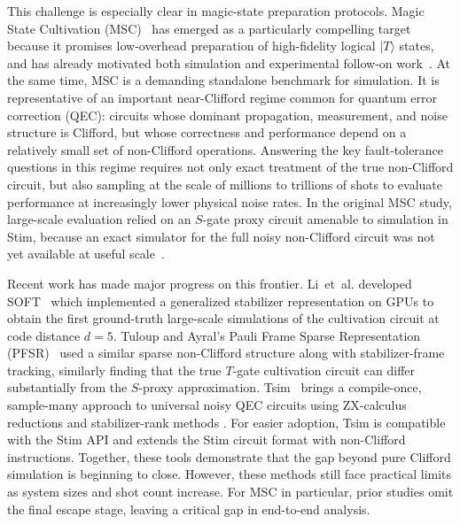 \documentclass[a4paper, onecolumn, unpublished]{quantumarticle}
\begin{document}
    This challenge is especially clear in magic-state preparation protocols. Magic State Cultivation (MSC)~\cite{gidneyMagicStateCultivation2024} has emerged as a particularly compelling target because it promises low-overhead preparation of high-fidelity logical $|T\rangle$ states, and has already motivated both simulation and experimental follow-on work~\cite{rosenfeldMagicStateCultivation2025, chenEfficientMagicState2026, dasuBreakingEvenMagic2025a, sahayFoldtransversalSurfaceCode2026a, hiranoEfficientMagicState2025, vakninEfficientMagicState2026}. At the same time, MSC is a demanding standalone benchmark for simulation. It is representative of an important near-Clifford regime common for quantum error correction (QEC): circuits whose dominant propagation, measurement, and noise structure is Clifford, but whose correctness and performance depend on a relatively small set of non-Clifford operations. Answering the key fault-tolerance questions in this regime requires not only exact treatment of the true non-Clifford circuit, but also sampling at the scale of millions to trillions of shots to evaluate performance at increasingly lower physical noise rates. In the original MSC study, large-scale evaluation  relied on an $S$-gate proxy circuit amenable to simulation in Stim, because an exact simulator for the full noisy non-Clifford circuit was not yet available at useful scale~\cite{gidneyMagicStateCultivation2024}.

    Recent work has made major progress on this frontier. Li~et~al. developed SOFT~\cite{liSOFTHighperformanceSimulator2025} which implemented a generalized stabilizer representation on GPUs to obtain the first ground-truth large-scale simulations of the cultivation circuit at code distance $d=5$. Tuloup and Ayral's Pauli Frame Sparse Representation (PFSR)~\cite{tuloupComputingLogicalError2026a} used a similar sparse non-Clifford structure along with stabilizer-frame tracking, similarly finding that the true $T$-gate cultivation circuit can differ substantially from the $S$-proxy approximation. Tsim~\cite{haenelTsimFastUniversal2026} brings a compile-once, sample-many approach to universal noisy QEC circuits using ZX-calculus reductions and stabilizer-rank methods \cite{wanCuttingStabiliserDecompositions2025, wanSimulatingMagicState2026a}. For easier adoption, Tsim is compatible with the Stim API and extends the Stim circuit format with non-Clifford instructions. Together, these tools demonstrate that the gap beyond pure Clifford simulation is beginning to close. However, these methods still face practical limits as system sizes and shot count increase. For MSC in particular, prior studies omit the final escape stage, leaving a critical gap in end-to-end analysis.
\end{document}
